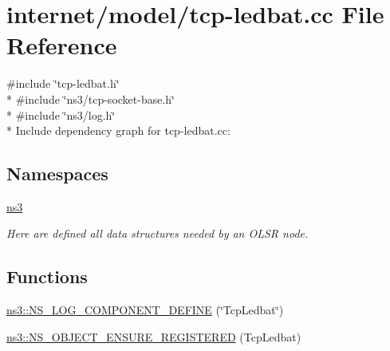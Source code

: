 \hypertarget{tcp-ledbat_8cc}{}\section{internet/model/tcp-\/ledbat.cc File Reference}
\label{tcp-ledbat_8cc}
{\ttfamily \#include \char`\"{}tcp-\/ledbat.\+h\char`\"{}}\\*
{\ttfamily \#include \char`\"{}ns3/tcp-\/socket-\/base.\+h\char`\"{}}\\*
{\ttfamily \#include \char`\"{}ns3/log.\+h\char`\"{}}\\*
Include dependency graph for tcp-\/ledbat.cc\+:
\subsection*{Namespaces}
\begin{DoxyCompactItemize}
\item 
 \hyperlink{namespacens3}{ns3}
\begin{DoxyCompactList}\small\item\em Here are defined all data structures needed by an O\+L\+SR node. \end{DoxyCompactList}\end{DoxyCompactItemize}
\subsection*{Functions}
\begin{DoxyCompactItemize}
\item 
\hyperlink{namespacens3_ac20ecaf55e8bb6b57d018fbe6b466b11}{ns3\+::\+N\+S\+\_\+\+L\+O\+G\+\_\+\+C\+O\+M\+P\+O\+N\+E\+N\+T\+\_\+\+D\+E\+F\+I\+NE} (\char`\"{}Tcp\+Ledbat\char`\"{})
\item 
\hyperlink{namespacens3_aed3a3bfefddbd1398b9475edbe6d882f}{ns3\+::\+N\+S\+\_\+\+O\+B\+J\+E\+C\+T\+\_\+\+E\+N\+S\+U\+R\+E\+\_\+\+R\+E\+G\+I\+S\+T\+E\+R\+ED} (Tcp\+Ledbat)
\end{DoxyCompactItemize}
